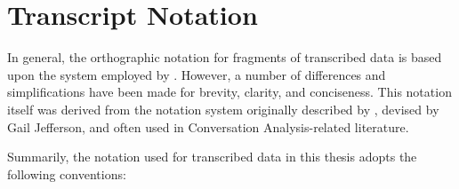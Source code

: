 


\chapter{Transcript Notation}\label{app:notation}



In general, the orthographic notation for fragments of transcribed data is based upon the system employed by \citet{Heath2010}.
However, a number of differences and simplifications have been made for brevity, clarity, and conciseness.
This notation itself was derived from the notation system originally described by \citet{Atkinson1984a}, devised by Gail Jefferson, and often used in Conversation Analysis-related literature.

Summarily, the notation used for transcribed data in this thesis adopts the following conventions:

